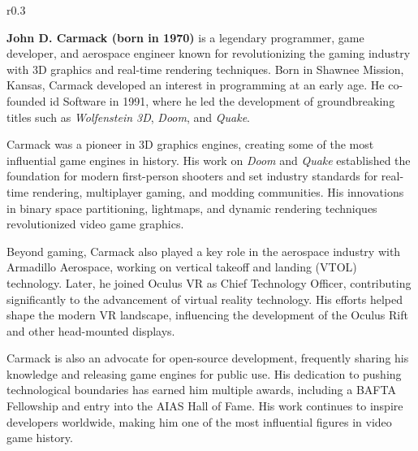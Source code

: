 \documentclass[12pt]{article}
\newcommand{\photoFilename}{images/JohnPhoto}
\newcommand{\photoClipPositionX}{0}
\newcommand{\photoClipPositionY}{0}
\newcommand{\photoSize}{5cm}
\begin{document}
\selectfont
\BgThispage
\begin{wrapfigure}{r}{0.3\textwidth}
\end{wrapfigure}

\nocite{wikipedia_john_carmack_2024} %

\textbf{John D. Carmack (born in 1970)} is a legendary programmer, game developer, and aerospace engineer known for revolutionizing the gaming industry with 3D graphics and real-time rendering techniques. Born in Shawnee Mission, Kansas, Carmack developed an interest in programming at an early age. He co-founded id Software in 1991, where he led the development of groundbreaking titles such as \textit{Wolfenstein 3D}, \textit{Doom}, and \textit{Quake}.

Carmack was a pioneer in 3D graphics engines, creating some of the most influential game engines in history. His work on \textit{Doom} and \textit{Quake} established the foundation for modern first-person shooters and set industry standards for real-time rendering, multiplayer gaming, and modding communities. His innovations in binary space partitioning, lightmaps, and dynamic rendering techniques revolutionized video game graphics.

Beyond gaming, Carmack also played a key role in the aerospace industry with Armadillo Aerospace, working on vertical takeoff and landing (VTOL) technology. Later, he joined Oculus VR as Chief Technology Officer, contributing significantly to the advancement of virtual reality technology. His efforts helped shape the modern VR landscape, influencing the development of the Oculus Rift and other head-mounted displays.

Carmack is also an advocate for open-source development, frequently sharing his knowledge and releasing game engines for public use. His dedication to pushing technological boundaries has earned him multiple awards, including a BAFTA Fellowship and entry into the AIAS Hall of Fame. His work continues to inspire developers worldwide, making him one of the most influential figures in video game history.
\end{document}
